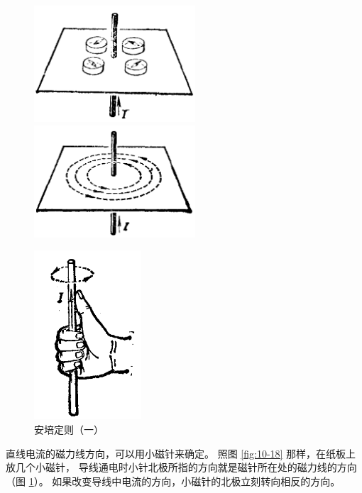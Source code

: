\begin{figure}[H]%
    \centering
    \begin{minipage}{7cm}
    \centering
    \includegraphics[width=6cm]{../pic/czwl2-ch10-18}
    \caption{}\label{fig:10-18}
    \end{minipage}
    \qquad
    \begin{minipage}{7cm}
    \centering
    \includegraphics[width=6cm]{../pic/czwl2-ch10-19}
    \caption{}\label{fig:10-19}
    \end{minipage}
\end{figure}

\begin{figure}
    \centering
    \includegraphics[width=4cm]{../pic/czwl2-ch10-20}
    \caption{安培定则（一）}\label{fig:10-20}
\end{figure}

直线电流的磁力线方向，可以用小磁针来确定。
照图 \ref{fig:10-18} 那样，在纸板上放几个小磁针，
导线通电时小针北极所指的方向就是磁针所在处的磁力线的方向（图 \ref{fig:10-19}）。
如果改变导线中电流的方向，小磁针的北极立刻转向相反的方向。


